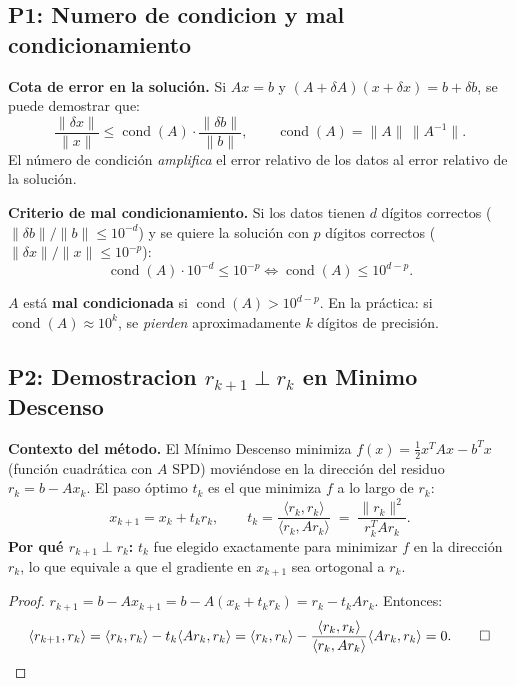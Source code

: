 \documentclass[11pt,a4paper]{article}
\begin{document}
\subsection{P1: Numero de condicion y mal condicionamiento}
\label{sec:q2_2024_p1}

\textbf{Cota de error en la solución.} Si $Ax=b$ y $(A+\delta A)(x+\delta x)=b+\delta b$, se puede demostrar que:
\[
  \frac{\|\delta x\|}{\|x\|} \le \operatorname{cond}(A)\cdot\frac{\|\delta b\|}{\|b\|},
  \qquad \operatorname{cond}(A) = \|A\|\,\|A^{-1}\|.
\]
El número de condición \emph{amplifica} el error relativo de los datos al error relativo de la solución.

\textbf{Criterio de mal condicionamiento.} Si los datos tienen $d$ dígitos correctos ($\|\delta b\|/\|b\| \le 10^{-d}$) y se quiere la solución con $p$ dígitos correctos ($\|\delta x\|/\|x\|\le 10^{-p}$):
\[
  \operatorname{cond}(A)\cdot 10^{-d} \le 10^{-p}
  \iff \operatorname{cond}(A) \le 10^{d-p}.
\]
\begin{tcolorbox}[clave]
$A$ está \textbf{mal condicionada} si $\operatorname{cond}(A) > 10^{d-p}$.
En la práctica: si $\operatorname{cond}(A)\approx 10^k$, se \emph{pierden} aproximadamente $k$ dígitos de precisión.
\end{tcolorbox}

\subsection{P2: Demostracion $r_{k+1} \perp r_k$ en Minimo Descenso}
\label{sec:q2_2024_p2}

\textbf{Contexto del método.} El Mínimo Descenso minimiza $f(x)=\tfrac{1}{2}x^TAx-b^Tx$ (función cuadrática con $A$ SPD) moviéndose en la dirección del residuo $r_k=b-Ax_k$. El paso óptimo $t_k$ es el que minimiza $f$ a lo largo de $r_k$:
\[
  x_{k+1} = x_k + t_k r_k, \qquad
  t_k = \frac{\langle r_k, r_k\rangle}{\langle r_k, Ar_k\rangle}
  \;=\;\frac{\|r_k\|^2}{r_k^TAr_k}.
\]
\textbf{Por qué $r_{k+1}\perp r_k$:} $t_k$ fue elegido exactamente para minimizar $f$ en la dirección $r_k$, lo que equivale a que el gradiente en $x_{k+1}$ sea ortogonal a $r_k$.

\begin{proof}
$r_{k+1} = b - Ax_{k+1} = b - A(x_k+t_kr_k) = r_k - t_kAr_k$. Entonces:
\[
  \langle r_{k+1},r_k\rangle = \langle r_k,r_k\rangle - t_k\langle Ar_k,r_k\rangle
  = \langle r_k,r_k\rangle
    - \frac{\langle r_k,r_k\rangle}{\langle r_k,Ar_k\rangle}\langle Ar_k,r_k\rangle = 0. \qed
\]
\end{proof}
\end{document}

